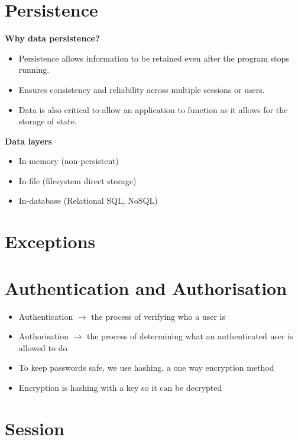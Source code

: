 \documentclass{report}
\begin{document}
\chapter{Persistence}
	
	\textbf{Why data persistence?}

		\begin{itemize}
			\item Persistence allows information to be retained even after the program stops running.
			\item Ensures consistency and reliability across multiple sessions or users.
			\item Data is also critical to allow an application to function as it allows for the storage of state.
		\end{itemize}

	\textbf{Data layers}
		
		\begin{itemize}
			\item In-memory (non-persistent)
			\item In-file (filesystem direct storage)
			\item In-database (Relational SQL, NoSQL)
		\end{itemize}

\chapter{Exceptions}
	
\chapter{Authentication and Authorisation}

	\begin{itemize}
		\item Authentication $\rightarrow$ the process of verifying who a user is
		\item Authorisation $\rightarrow$ the process of determining what an authenticated user is allowed to do
		\item To keep passwords safe, we use hashing, a one way encryption method
		\item Encryption is hashing with a key so it can be decrypted
	\end{itemize}

\chapter{Session}
\end{document}
